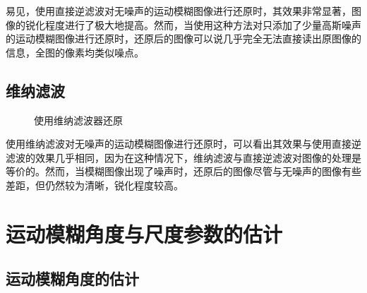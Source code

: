 \documentclass[11pt, a4paper]{article}
\begin{document}
易见，使用直接逆滤波对无噪声的运动模糊图像进行还原时，其效果非常显著，图像的锐化程度进行了极大地提高。然而，当使用这种方法对只添加了少量高斯噪声的运动模糊图像进行还原时，还原后的图像可以说几乎完全无法直接读出原图像的信息，全图的像素均类似噪点。

\subsection{维纳滤波}

\begin{figure}[H]
  \centering
  \hspace{1in}
  \caption{使用维纳滤波器还原}
  \label{fig:weiner} %
\end{figure}

使用维纳滤波对无噪声的运动模糊图像进行还原时，可以看出其效果与使用直接逆滤波的效果几乎相同，因为在这种情况下，维纳滤波与直接逆滤波对图像的处理是等价的。然而，当模糊图像出现了噪声时，还原后的图像尽管与无噪声的图像有些差距，但仍然较为清晰，锐化程度较高。

\section{运动模糊角度与尺度参数的估计}

\subsection{运动模糊角度的估计}
\end{document}
